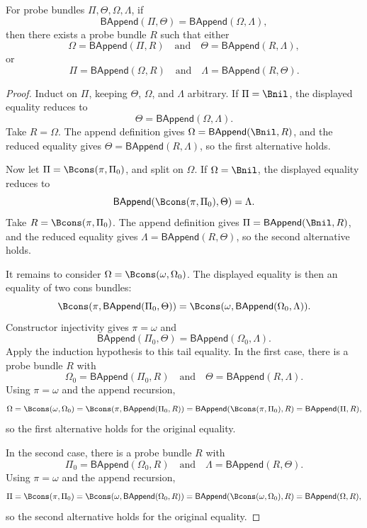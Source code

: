 \begin{theorem}
\label{thm:bundle-append-levi-residual-decomposition}
For probe bundles $\Pi,\Theta,\Omega,\Lambda$, if
$$
\mathsf{BAppend}(\Pi,\Theta)=\mathsf{BAppend}(\Omega,\Lambda),
$$
then there exists a probe bundle $R$ such that either
$$
\Omega=\mathsf{BAppend}(\Pi,R)
\quad\text{and}\quad
\Theta=\mathsf{BAppend}(R,\Lambda),
$$
or
$$
\Pi=\mathsf{BAppend}(\Omega,R)
\quad\text{and}\quad
\Lambda=\mathsf{BAppend}(R,\Theta).
$$
\end{theorem}
\begin{proof}
Induct on $\Pi$, keeping $\Theta$, $\Omega$, and $\Lambda$ arbitrary. If $\Pi=\Bnil$, the displayed equality reduces to
$$
\Theta=\mathsf{BAppend}(\Omega,\Lambda).
$$
Take $R=\Omega$. The append definition gives $\Omega=\mathsf{BAppend}(\Bnil,R)$, and the reduced equality gives $\Theta=\mathsf{BAppend}(R,\Lambda)$, so the first alternative holds.

Now let $\Pi=\Bcons(\pi,\Pi_0)$, and split on $\Omega$. If $\Omega=\Bnil$, the displayed equality reduces to
$$
\mathsf{BAppend}(\Bcons(\pi,\Pi_0),\Theta)=\Lambda.
$$
Take $R=\Bcons(\pi,\Pi_0)$. The append definition gives $\Pi=\mathsf{BAppend}(\Bnil,R)$, and the reduced equality gives $\Lambda=\mathsf{BAppend}(R,\Theta)$, so the second alternative holds.

It remains to consider $\Omega=\Bcons(\omega,\Omega_0)$. The displayed equality is then an equality of two cons bundles:
$$
\Bcons(\pi,\mathsf{BAppend}(\Pi_0,\Theta))
=
\Bcons(\omega,\mathsf{BAppend}(\Omega_0,\Lambda)).
$$
Constructor injectivity gives $\pi=\omega$ and
$$
\mathsf{BAppend}(\Pi_0,\Theta)=\mathsf{BAppend}(\Omega_0,\Lambda).
$$
Apply the induction hypothesis to this tail equality. In the first case, there is a probe bundle $R$ with
$$
\Omega_0=\mathsf{BAppend}(\Pi_0,R)
\quad\text{and}\quad
\Theta=\mathsf{BAppend}(R,\Lambda).
$$
Using $\pi=\omega$ and the append recursion,
$$
\Omega
=\Bcons(\omega,\Omega_0)
=\Bcons(\pi,\mathsf{BAppend}(\Pi_0,R))
=\mathsf{BAppend}(\Bcons(\pi,\Pi_0),R)
=\mathsf{BAppend}(\Pi,R),
$$
so the first alternative holds for the original equality.

In the second case, there is a probe bundle $R$ with
$$
\Pi_0=\mathsf{BAppend}(\Omega_0,R)
\quad\text{and}\quad
\Lambda=\mathsf{BAppend}(R,\Theta).
$$
Using $\pi=\omega$ and the append recursion,
$$
\Pi
=\Bcons(\pi,\Pi_0)
=\Bcons(\omega,\mathsf{BAppend}(\Omega_0,R))
=\mathsf{BAppend}(\Bcons(\omega,\Omega_0),R)
=\mathsf{BAppend}(\Omega,R),
$$
so the second alternative holds for the original equality.
\end{proof}
